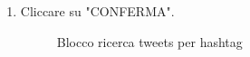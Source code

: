 \begin{enumerate}
	\item Cliccare su "CONFERMA".
	\begin{figure}[!ht]
		\centering
		\caption{Blocco ricerca tweets per hashtag}
	\end{figure}
\end{enumerate}
\newpage
